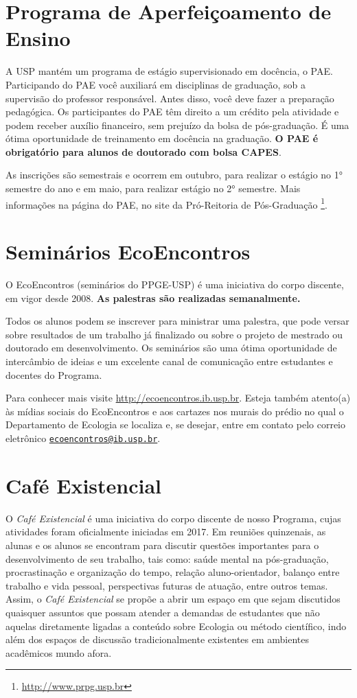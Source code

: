 \section{Programa de Aperfeiçoamento de Ensino}
\label{subsec:pae}

A USP mantém um programa de estágio supervisionado em docência, o
PAE. Participando do PAE você auxiliará em disciplinas de graduação,
sob a supervisão do professor responsável.  Antes disso, você deve
fazer a preparação pedagógica. Os participantes do PAE têm direito a
um crédito pela atividade e podem receber auxílio financeiro, sem
prejuízo da bolsa de pós-graduação. É uma ótima oportunidade de
treinamento em docência na graduação. \textbf{O PAE é obrigatório para
  alunos de doutorado com bolsa CAPES}.

As inscrições são semestrais e ocorrem em outubro, para realizar o
estágio no 1° semestre do ano e em maio, para realizar estágio no 2°
semestre. Mais informações na página do PAE, no site da Pró-Reitoria
de Pós-Graduação \footnote{\url{http://www.prpg.usp.br}}.

\section{Seminários EcoEncontros}
\label{subsec:seminarios}
O EcoEncontros (seminários do PPGE-USP) é uma iniciativa do corpo
discente, em vigor desde 2008. \textbf{As palestras são realizadas
  semanalmente. }

Todos os alunos podem se inscrever para ministrar uma palestra, que
pode versar sobre resultados de um trabalho já finalizado ou sobre o
projeto de mestrado ou doutorado em desenvolvimento. Os seminários são
uma ótima oportunidade de intercâmbio de ideias e um excelente canal
de comunicação entre estudantes e docentes do Programa.

Para conhecer mais visite \url{http://ecoencontros.ib.usp.br}.  Esteja
também atento(a) às mídias sociais do EcoEncontros e aos cartazes nos
murais do prédio no qual o Departamento de Ecologia se localiza e, se
desejar, entre em contato pelo correio eletrônico
\href{mailto:ecoencontros@ib.usp.br}{\nolinkurl{ecoencontros@ib.usp.br}}.

\section{Café Existencial}
\label{cafe-existencial}

O \emph{Café Existencial} é uma iniciativa do corpo discente de nosso
Programa, cujas atividades foram oficialmente iniciadas em 2017. Em
reuniões quinzenais, as alunas e os alunos se encontram para discutir
questões importantes para o desenvolvimento de seu trabalho, tais
como: saúde mental na pós-graduação, procrastinação e organização do
tempo, relação aluno-orientador, balanço entre trabalho e vida
pessoal, perspectivas futuras de atuação, entre outros temas. Assim, o
\emph{Café Existencial} se propõe a abrir um espaço em que sejam
discutidos quaisquer assuntos que possam atender a demandas de
estudantes que não aquelas diretamente ligadas a conteúdo sobre
Ecologia ou método científico, indo além dos espaços de discussão
tradicionalmente existentes em ambientes acadêmicos mundo afora.

